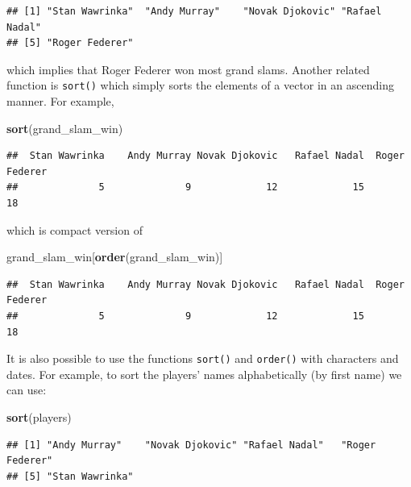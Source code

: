 \documentclass[12pt,]{krantz}
\newenvironment{Shaded}{\begin{snugshade}}{\end{snugshade}}
\newcommand{\KeywordTok}[1]{\textcolor[rgb]{0.27,0.27,0.27}{\textbf{#1}}}
\newcommand{\NormalTok}[1]{#1}
\begin{document}
\begin{verbatim}
## [1] "Stan Wawrinka"  "Andy Murray"    "Novak Djokovic" "Rafael Nadal"  
## [5] "Roger Federer"
\end{verbatim}

which implies that Roger Federer won most grand slams. Another related
function is \texttt{sort()} which simply sorts the elements of a vector
in an ascending manner. For example,

\begin{Shaded}
\begin{Highlighting}[]
\KeywordTok{sort}\NormalTok{(grand_slam_win)}
\end{Highlighting}
\end{Shaded}

\begin{verbatim}
##  Stan Wawrinka    Andy Murray Novak Djokovic   Rafael Nadal  Roger Federer 
##              5              9             12             15             18
\end{verbatim}

which is compact version of

\begin{Shaded}
\begin{Highlighting}[]
\NormalTok{grand_slam_win[}\KeywordTok{order}\NormalTok{(grand_slam_win)]}
\end{Highlighting}
\end{Shaded}

\begin{verbatim}
##  Stan Wawrinka    Andy Murray Novak Djokovic   Rafael Nadal  Roger Federer 
##              5              9             12             15             18
\end{verbatim}

It is also possible to use the functions \texttt{sort()} and
\texttt{order()} with characters and dates. For example, to sort the
players' names alphabetically (by first name) we can use:

\begin{Shaded}
\begin{Highlighting}[]
\KeywordTok{sort}\NormalTok{(players)}
\end{Highlighting}
\end{Shaded}

\begin{verbatim}
## [1] "Andy Murray"    "Novak Djokovic" "Rafael Nadal"   "Roger Federer" 
## [5] "Stan Wawrinka"
\end{verbatim}
\end{document}
